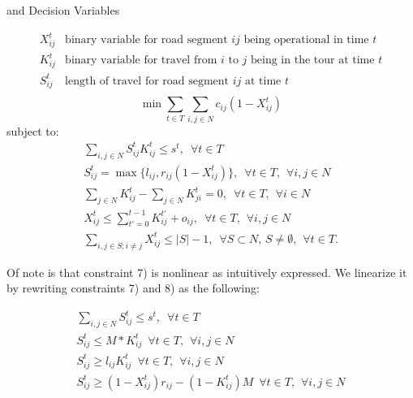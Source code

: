 \documentclass{article}
\begin{document}
	and Decision Variables
	
\begin{displaymath}
\begin{array}{ll}
X_{ij}^t & \mbox{binary variable for road segment $ij$ being operational in time $t$}\\
K_{ij}^t & \mbox{binary variable for travel from $i$ to $j$ being in the tour at time $t$}\\
S_{ij}^t & \mbox{length of travel for road segment $ij$ at time $t$}\\
\end{array}
\end{displaymath}	
\begin{equation}
\min \sum_{t \in T}  \sum_{i,j \in N} c_{ij}(1-X_{ij}^t) 
\end{equation}
subject to:
\begin{eqnarray}
\sum_{i,j \in N} S_{ij}^t K_{ij}^t \leq s^t, \hspace{6pt} \forall t\in T \\
S_{ij}^t = \max \{l_{ij}, r_{ij}(1-X_{ij}^t) \}, \hspace{6pt} \forall t\in T, \hspace{5pt} \forall i,j \in N\\
\sum_{j \in N} K_{ij}^t - \sum_{j \in N} K_{ji}^t = 0, \hspace{6pt} \forall t\in T, \hspace{5pt} \forall i \in N\\
X_{ij}^t \le \sum_{t'=0}^{t-1} K_{ij}^{t'} + o_{ij} , \hspace{6pt} \forall t\in T,  \hspace{5pt} \forall i,j \in N\\
\sum_{i,j \in S; i\neq j} X_{ij}^t \leq |S|-1, \hspace{6pt} \forall S \subset N, \hspace{2pt} S \neq \emptyset, \hspace{5pt} \forall t\in T.
\end{eqnarray}

Of note is that constraint 7) is nonlinear as intuitively expressed. We linearize it by rewriting constraints 7) and 8) as the following:

\begin{eqnarray}
\sum_{i,j \in N} S_{ij}^t \leq s^t, \hspace{6pt} \forall t\in T \\
S_{ij}^t \leq M*K_{ij}^t \hspace{6pt} \forall t\in T, \hspace{5pt} \forall i,j \in N\\
S_{ij}^t \geq l_{ij}K_{ij}^t \hspace{6pt} \forall t\in T, \hspace{5pt} \forall i,j \in N\\
S_{ij}^t \geq (1-X_{ij}^t)r_{ij} - (1-K_{ij}^t)M \hspace{6pt} \forall t\in T, \hspace{5pt} \forall i,j \in N
\end{eqnarray}
\end{document}
